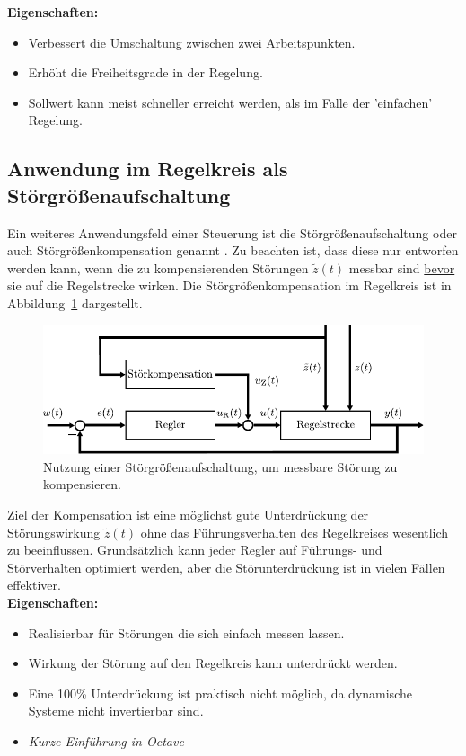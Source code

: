 \textbf{Eigenschaften:}
\begin{itemize}
	\item Verbessert die Umschaltung zwischen zwei Arbeitspunkten.
	\item Erhöht die Freiheitsgrade in der Regelung.
	\item Sollwert kann meist schneller erreicht werden, als im Falle der 'einfachen' Regelung. 
\end{itemize}
%
\subsection{Anwendung im Regelkreis als Störgrößenaufschaltung} 
%
Ein weiteres Anwendungsfeld einer Steuerung ist die Störgrößenaufschaltung oder auch Störgrößenkompensation genannt \cite{Foellinger94,Lunze10}. Zu beachten ist, dass diese nur entworfen werden kann, wenn die zu kompensierenden Störungen $\tilde{z}(t)$ messbar sind \underline{bevor} sie auf die Regelstrecke wirken. Die Störgrößenkompensation im Regelkreis ist in Abbildung~\ref{fig:stoergroesse} dargestellt.
%
\begin{figure}[h]
	\centering
	\includegraphics[width=0.95\linewidth]{Abbildungen/Grundbegriffe/PDF/StoerGroessen.pdf}
	\caption{Nutzung einer Störgrößenaufschaltung, um messbare Störung zu kompensieren.}
	\label{fig:stoergroesse}
\end{figure}
%
Ziel der Kompensation ist eine möglichst gute Unterdrückung der Störungswirkung $\tilde{z}(t)$ ohne das Führungsverhalten des Regelkreises wesentlich zu beeinflussen. Grundsätzlich kann jeder Regler auf Führungs- und Störverhalten optimiert werden, aber die Störunterdrückung ist in vielen Fällen effektiver.\\

\textbf{Eigenschaften:}
\begin{itemize}
	\item Realisierbar für Störungen die sich einfach messen lassen.
	\item Wirkung der Störung auf den Regelkreis kann unterdrückt werden.
	\item Eine 100\% Unterdrückung ist praktisch nicht möglich, da dynamische Systeme nicht invertierbar sind.
\end{itemize}
%
\begin{simulation}{}{}
	\begin{itemize}
		\item \textit{Kurze Einführung in Octave}
	\end{itemize}
\end{simulation}
%
